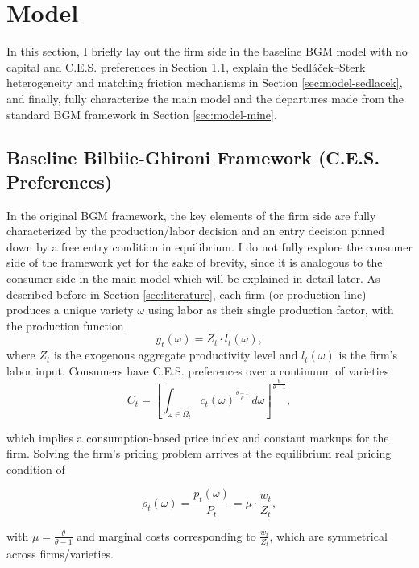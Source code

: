\documentclass[a4paper,12pt]{article} %
\numberwithin{equation}{section} %
\numberwithin{figure}{section}
\numberwithin{table}{section}
\begin{document}
\section{Model}
\label{sec:model}

In this section, I briefly lay out the firm side in the baseline BGM model with no capital and C.E.S. preferences in Section \ref{sec:model-bilbiie}, explain the Sedláček–Sterk
heterogeneity and matching friction mechanisms in Section \ref{sec:model-sedlacek}, and finally, fully characterize the main model and the departures made
from the standard BGM framework in Section \ref{sec:model-mine}. 

\subsection{Baseline Bilbiie-Ghironi Framework (C.E.S. Preferences)}
\label{sec:model-bilbiie}

In the original BGM framework, the key elements of the firm side are fully characterized by the production/labor decision 
and an entry decision pinned down by a free entry condition in equilibrium. I do not fully explore the consumer side of the framework yet for the sake of brevity, since it is analogous to the consumer side in the main model which will be 
explained in detail later. As described before in Section \ref{sec:literature}, each firm (or production line) produces a unique variety $\omega$ using labor as their single 
production factor, with the production function 
\[
    y_t(\omega) = Z_t \cdot l_t(\omega),
\]
where $Z_t$ is the exogenous aggregate productivity level and $l_t(\omega)$ is the firm's labor input. Consumers have C.E.S. preferences over a continuum
of varieties 
\[
    C_t = \left[\int_{\omega \in \Omega_t} c_t(\omega)^{\frac{\theta-1}{\theta}}\,d\omega\right]^{\frac{\theta}{\theta-1}},
\]

which implies a consumption-based price index and constant markups for the firm. Solving the firm's pricing problem arrives at the equilibrium real pricing
condition of

 \[
    \rho_t(\omega) = \frac{p_t(\omega)}{P_t} =  \mu \cdot \frac{w_t}{Z_t},
 \]

with $\mu=\frac{\theta}{\theta-1}$ and marginal costs corresponding to $\frac{w_t}{Z_t}$, which are symmetrical across firms/varieties.
\end{document}
